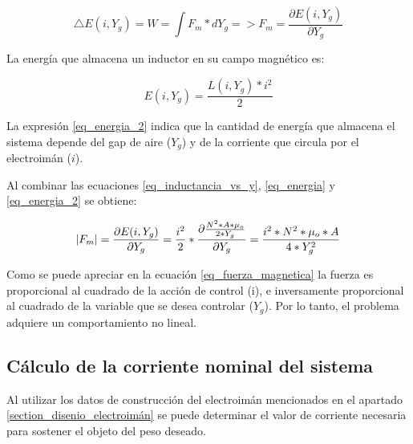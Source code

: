 \begin{equation}\label{eq_energia}
	\triangle E(i,Y_g)=W=\int{F_{m}*dY_g}=>F_{m}=\frac{\partial{E(i,Y_g)}}{\partial{Y_g}}
\end{equation}

\noindent La energía que almacena un inductor en su campo magnético es:

\begin{equation}\label{eq_energia_2}
	E(i,Y_g)=\frac{L(i,Y_g)*i^{2}}{2}
\end{equation}

\noindent La expresión \ref{eq_energia_2} indica que la cantidad de energía que almacena el sistema depende del gap de aire ($Y_{g}$) y de la corriente que circula por el electroimán ($i$). 

\noindent Al combinar las ecuaciones \ref{eq_inductancia_vs_y}, \ref{eq_energia} y \ref{eq_energia_2} se obtiene:

\begin{equation}\label{eq_fuerza_magnetica}
	\lvert F_{m}\rvert=\frac{\partial{E(i,Y_g)}}{\partial{Y_g}}=\frac{i^{2}}{2}*\frac{\partial{\frac{{N^{2}*A*\mu_{o}}}{2*Y_{g}}}}{\partial{Y_g}}=\frac{i^{2}*N^{2}*\mu_{o}*A}{4*Y_{g}^{2}}
\end{equation}

\noindent Como se puede apreciar en la ecuación \ref{eq_fuerza_magnetica} la fuerza es proporcional al cuadrado de la acción de control (i), e inversamente proporcional al cuadrado de la variable que se desea controlar ($Y_{g}$). Por lo tanto, el problema adquiere un comportamiento no lineal.


\subsection{Cálculo de la corriente nominal del sistema}

\noindent Al utilizar los datos de construcción del electroimán mencionados en el apartado \ref{section_disenio_electroimán} se puede determinar el valor de corriente necesaria para sostener el objeto del peso deseado.
	


